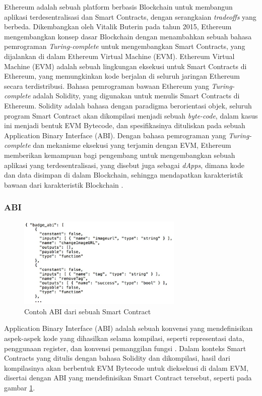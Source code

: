 Ethereum adalah sebuah platform berbasis Blockchain untuk membangun aplikasi terdesentralisasi dan Smart Contracts, dengan serangkaian \textit{tradeoffs} yang berbeda. Dikembangkan oleh Vitalik Buterin pada tahun 2015, Ethereum mengembangkan konsep dasar Blockchain dengan menambahkan sebuah bahasa pemrograman \textit{Turing-complete} untuk mengembangkan Smart Contracts, yang dijalankan di dalam Ethereum Virtual Machine (EVM). Ethereum Virtual Machine (EVM) adalah sebuah lingkungan eksekusi untuk Smart Contracts di Ethereum, yang memungkinkan kode berjalan di seluruh jaringan Ethereum secara terdistribusi. Bahasa pemrograman bawaan Ethereum yang \textit{Turing-complete} adalah Solidity, yang digunakan untuk menulis Smart Contracts di Ethereum. Solidity adalah bahasa dengan paradigma berorientasi objek, seluruh program Smart Contract akan dikompilasi menjadi sebuah \textit{byte-code}, dalam kasus ini menjadi bentuk EVM Bytecode, dan spesifikasinya dituliskan pada sebuah Application Binary Interface (ABI). Dengan bahasa pemrograman yang \textit{Turing-complete} dan mekanisme eksekusi yang terjamin dengan EVM, Ethereum memberikan kemampuan bagi pengembang untuk mengembangkan sebuah aplikasi yang terdesentralisasi, yang disebut juga sebagai \textit{dApps}, dimana kode dan data disimpan di dalam Blockchain, sehingga mendapatkan karakteristik bawaan dari karakteristik Blockchain \parencite{buterin2013ethereum}.

\subsubsection{ABI}
\label{subsubsec:abi}

\begin{figure}[ht]
  \centering
  \includegraphics[width=0.7\textwidth]{resources/chapter-2/smart-contract-abi.jpg}
  \caption{Contoh ABI dari sebuah Smart Contract \parencite{third2017linked}}
  \label{image:abi-example}
\end{figure}

Application Binary Interface (ABI) adalah sebuah konvensi yang mendefinisikan aspek-aspek kode yang dihasilkan selama kompilasi, seperti representasi data, penggunaan register, dan konvensi pemanggilan fungsi \parencite{sciencedirect2024}. Dalam konteks Smart Contracts yang ditulis dengan bahasa Solidity dan dikompilasi, hasil dari kompilasinya akan berbentuk EVM Bytecode untuk dieksekusi di dalam EVM, disertai dengan ABI yang mendefinisikan Smart Contract tersebut, seperti pada gambar \ref{image:abi-example}.


